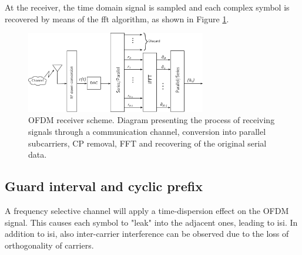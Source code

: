 At the receiver, the time domain signal is sampled and each complex symbol is recovered by means of the \gls{fft} algorithm, as shown in Figure \ref{fig:ofdm_receive}.

\begin{figure}[H]
	\centering
	\includegraphics[width=0.7\textwidth]{Images/theoretical/ofdm/ofdm_receive.png}
	\caption{\small OFDM receiver scheme. Diagram presenting the process of receiving signals through a communication channel, conversion into parallel subcarriers, CP removal, FFT and recovering of the original serial data.}
	\label{fig:ofdm_receive}
\end{figure}

\subsection{Guard interval and cyclic prefix}
A frequency selective channel will apply a time-dispersion effect on the OFDM signal. This causes each symbol to "leak" into the adjacent ones, leading to \gls{isi}.
In addition to \gls{isi}, also inter-carrier interference can be observed due to the loss of orthogonality of carriers.

